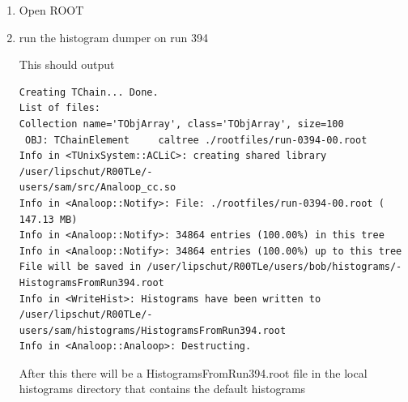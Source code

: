 \documentclass[paper=a4, fontsize=12pt]{scrartcl} %
\numberwithin{equation}{section} %
\numberwithin{figure}{section} %
\numberwithin{table}{section} %
\newcommand{\example}[1]{\begin{center} \fbox{#1} \end{center}}
\begin{document}
\begin{enumerate}
\item Open ROOT
\example{root}

\item run the histogram dumper on run 394
\example{.x main.C(394)}

This should output

\begin{verbatim}
Creating TChain... Done.
List of files:
Collection name='TObjArray', class='TObjArray', size=100
 OBJ: TChainElement     caltree ./rootfiles/run-0394-00.root
Info in <TUnixSystem::ACLiC>: creating shared library /user/lipschut/R00TLe/-
users/sam/src/Analoop_cc.so
Info in <Analoop::Notify>: File: ./rootfiles/run-0394-00.root ( 147.13 MB)
Info in <Analoop::Notify>: 34864 entries (100.00%) in this tree
Info in <Analoop::Notify>: 34864 entries (100.00%) up to this tree
File will be saved in /user/lipschut/R00TLe/users/bob/histograms/-
HistogramsFromRun394.root
Info in <WriteHist>: Histograms have been written to /user/lipschut/R00TLe/-
users/sam/histograms/HistogramsFromRun394.root
Info in <Analoop::Analoop>: Destructing.
\end{verbatim}

After this there will be a HistogramsFromRun394.root file in the local histograms directory that contains the default histograms

\end{enumerate}
\end{document}
